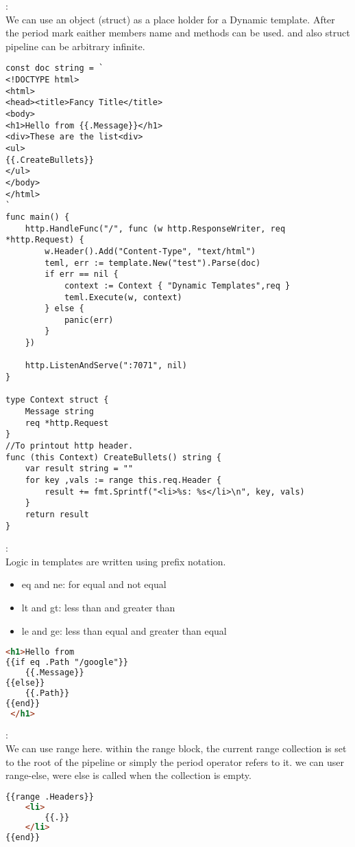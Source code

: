\begin{note}:\\
We can use an object (struct) as a place holder for a Dynamic template. After the period mark eaither members name and methods can be used. and also struct pipeline can be arbitrary infinite.
\begin{lstlisting}[language=Golang]
const doc string = `
<!DOCTYPE html>
<html>
<head><title>Fancy Title</title>
<body>
<h1>Hello from {{.Message}}</h1>
<div>These are the list<div>
<ul>
{{.CreateBullets}}
</ul>
</body>
</html>
`
func main() {	
	http.HandleFunc("/", func (w http.ResponseWriter, req *http.Request) {
		w.Header().Add("Content-Type", "text/html")
		teml, err := template.New("test").Parse(doc)
		if err == nil {
			context := Context { "Dynamic Templates",req }
			teml.Execute(w, context)
		} else {
			panic(err)
		}
	})

	http.ListenAndServe(":7071", nil)
}

type Context struct {
	Message string
	req *http.Request
}
//To printout http header.
func (this Context) CreateBullets() string {
	var result string = ""
	for key ,vals := range this.req.Header {
		result += fmt.Sprintf("<li>%s: %s</li>\n", key, vals)
	}
	return result
}
\end{lstlisting}
\end{note}
\begin{note}:\\
Logic in templates are written using prefix notation.
\begin{itemize}
	\item eq and ne: for equal and not equal
	\item lt and gt: less than and greater than
	\item le and ge: less than equal and greater than equal
\end{itemize}
\begin{lstlisting}[language=html]
<h1>Hello from
{{if eq .Path "/google"}}
	{{.Message}} 
{{else}}
	{{.Path}}
{{end}}
 </h1>
\end{lstlisting}
\end{note}
\begin{note}:\\
We can use range here. within the range block, the current range collection is set to the root of the pipeline or simply the period operator refers to it. we can user range-else, were else is called when the collection is empty.
\begin{lstlisting}[language=html]
{{range .Headers}}
	<li>
		{{.}}
	</li>
{{end}}
\end{lstlisting}
\end{note}
